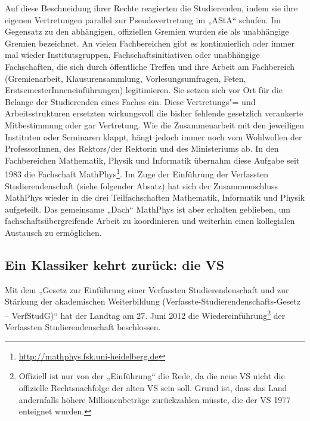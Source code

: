 Auf diese Beschneidung ihrer Rechte reagierten die
Studierenden, indem sie ihre eigenen Vertretungen parallel zur
Pseudovertretung im „AStA“ schufen. Im Gegensatz zu den abhängigen,
offiziellen Gremien wurden sie als unabhängige Gremien bezeichnet.
An vielen Fachbereichen gibt es kontinuierlich oder immer mal wieder
Institutsgruppen, Fachschaftsinitiativen oder unabhängige Fachschaften,
die sich durch öffentliche Treffen und ihre Arbeit am Fachbereich
(Gremienarbeit, Klausurensammlung, Vorlesungsumfragen, Feten,
ErstsemesterInneneinführungen) legitimieren. Sie setzen sich vor Ort für
die Belange der Studierenden eines Faches ein. Diese Vertretungs"= und
Arbeitsstrukturen ersetzten wirkungsvoll die bisher fehlende gesetzlich verankerte
Mitbestimmung oder gar Vertretung. Wie die Zusammenarbeit mit den
jeweiligen Instituten oder Seminaren klappt, hängt jedoch immer noch vom
Wohlwollen der ProfessorInnen, des Rektors/der Rektorin und des Ministeriums ab. In den
Fachbereichen Mathematik, Physik und Informatik übernahm diese Aufgabe
seit 1983 die Fachschaft MathPhys\footnote{\url{http://mathphys.fsk.uni-heidelberg.de}}.
Im Zuge der Einführung der Verfassten Studierendenschaft (siehe folgender Absatz) hat sich der Zusammenschluss MathPhys
wieder in die drei Teilfachschaften Mathematik, Informatik und Physik aufgeteilt.
Das gemeinsame „Dach“ MathPhys ist aber erhalten geblieben, um fachschaftsübergreifende
Arbeit zu koordinieren und weiterhin einen kollegialen Austausch zu ermöglichen.


\subsection{Ein Klassiker kehrt zurück: die VS}

Mit dem „Gesetz zur Einführung einer Verfassten Studierendenschaft und
zur Stärkung der akademischen Weiterbildung
(Ver\-fass\-te-Stu\-dier\-en\-den\-schafts-Ge\-setz -- VerfStudG)“ hat der Landtag am 27. Juni 2012
die Wiedereinführung\footnote{Offiziell ist nur von der „Einführung“ die
Rede, da die neue VS nicht die offizielle Rechtsnachfolge der alten VS sein soll.
Grund ist, dass das Land andernfalls höhere Millionenbeträge zurückzahlen müsste,
die der VS 1977 enteignet wurden.} der Verfassten Studierendenschaft beschlossen.

